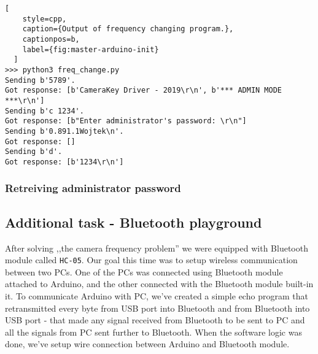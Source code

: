 \begin{minipage}{\linewidth}
  \begin{lstlisting}[
    style=cpp,
    caption={Output of frequency changing program.},
    captionpos=b,
    label={fig:master-arduino-init}
  ]
>>> python3 freq_change.py
Sending b'5789'.
Got response: [b'CameraKey Driver - 2019\r\n', b'*** ADMIN MODE ***\r\n']
Sending b'c 1234'.
Got response: [b"Enter administrator's password: \r\n"]
Sending b'0.891.1Wojtek\n'.
Got response: []
Sending b'd'.
Got response: [b'1234\r\n']
  \end{lstlisting}
  \end{minipage}


\subsubsection{Retreiving administrator password}

\subsection{Additional task - Bluetooth playground}

After solving ,,the camera frequency problem'' we were equipped with Bluetooth module called \texttt{HC-05}. Our goal this time was to setup wireless communication between two PCs. One of the PCs was connected using Bluetooth module attached to Arduino, and the other connected with the Bluetooth module built-in it. To communicate Arduino with PC, we've created a simple echo program that retransmitted every byte from USB port into Bluetooth and from Bluetooth into USB port - that made any signal received from Bluetooth to be sent to PC and all the signals from PC sent further to Bluetooth. When the software logic was done, we've setup wire connection between Arduino and Bluetooth module.



